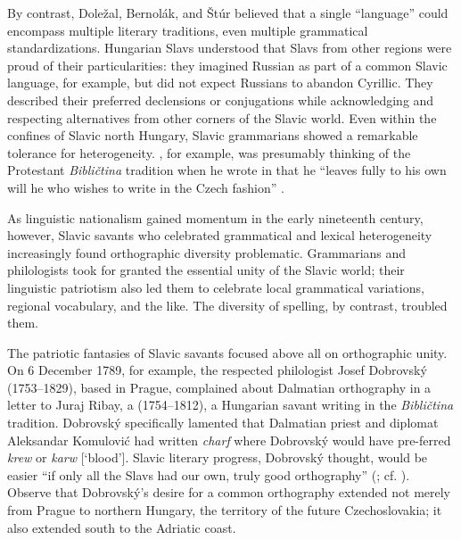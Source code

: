 \noindent By contrast, Doležal, Bernolák, and Štúr believed that a single “language” could encompass multiple literary traditions, even multiple grammatical standardizations. Hungarian Slavs understood that Slavs from other regions were proud of their particularities: they imagined Russian as part of a common Slavic language, for example, but did not expect Russians to abandon Cyrillic. They described their preferred declensions or conjugations while acknowledging and respecting alternatives from other corners of the Slavic world. Even within the confines of Slavic north Hungary, Slavic grammarians showed a remarkable tolerance for heterogeneity. \citeauthor{bernolak_dissertatio_1787}, for example, was presumably thinking of the Protestant \textit{Bibličtina} tradition when he wrote in \citeyear{bernolak_dissertatio_1787} that he “leaves fully to his own will he who wishes to write in the Czech fashion” \citep[22--23]{bernolak_dissertatio_1787}.

As linguistic nationalism gained momentum in the early nineteenth century, however, Slavic savants who celebrated grammatical and lexical heterogeneity increasingly found orthographic diversity problematic. Grammarians and philologists took for granted the essential unity of the Slavic world; their linguistic patriotism also led them to celebrate local grammatical variations, regional vocabulary, and the like. The diversity of spelling, by contrast, troubled them.

The patriotic fantasies of Slavic savants focused above all on orthographic unity. On 6 December 1789, for example, the respected philologist Josef Dobrov\-ský (1753--1829), based in Prague, complained about Dalmatian orthography in a letter to Juraj Ribay, a (1754--1812), a Hungarian savant writing in the \textit{Bibličtina} tradition. Dobrovský specifically lamented that Dalmatian priest and diplomat Aleksandar Komulović had written \textit{charf} where Dobrovský would have pre-\linebreak{}ferred \textit{krew} or \textit{karw} [‘blood’]. Slavic literary progress, Dobrovský thought, would be easier “if only all the Slavs had our own, truly good orthography” (\cite[150]{patera_korrespondence_1913}; cf. \cite[217]{agnew_origins_1993}). Observe that Dobrovský’s desire for a common orthography extended not merely from Prague to northern Hungary, the territory of the future Czechoslovakia; it also extended south to the Adriatic coast.

